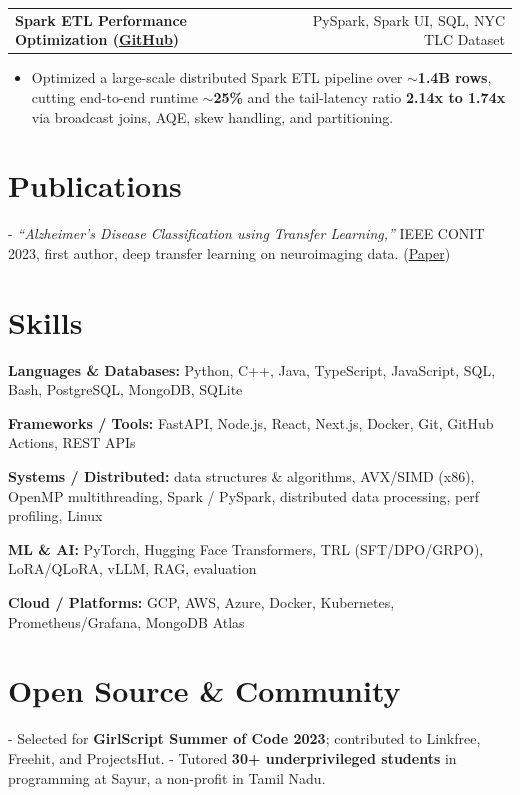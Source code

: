 \documentclass[letterpaper,11pt]{article}
\makeatletter
\newcommand{\projItem}[2]{%
  \vspace{2pt}
  \begin{tabular*}{\textwidth}{@{}l@{\extracolsep{\fill}}r@{}}
    \textbf{#1} & #2 \\
  \end{tabular*}\par\vspace{-3pt}
}
\newcommand{\skillLine}[2]{\textbf{#1:} #2\par\vspace{1.5pt}}
\newcommand{\inlineBlock}[1]{{\setlength{\leftskip}{0.18in}\small #1\par}}
\makeatother
\begin{document}
\projItem{Spark ETL Performance Optimization {\normalfont\small(\href{https://github.com/Deva-1903/Spark-ETL-Optimization}{GitHub})}}{PySpark, Spark UI, SQL, NYC TLC Dataset}
\begin{itemize}
  \item Optimized a large-scale distributed Spark ETL pipeline over \textbf{$\sim$1.4B rows}, cutting end-to-end runtime \textbf{$\sim$25\%} and the tail-latency ratio \textbf{2.14x to 1.74x} via broadcast joins, AQE, skew handling, and partitioning.
\end{itemize}

\section{Publications}
\vspace{2pt}
\inlineBlock{- \textit{``Alzheimer's Disease Classification using Transfer Learning,''} IEEE CONIT 2023, first author, deep transfer learning on neuroimaging data. {\normalfont\small(\href{https://ieeexplore.ieee.org/document/10205760}{Paper})}}

\section{Skills}
\skillLine{Languages \& Databases}{Python, C++, Java, TypeScript, JavaScript, SQL, Bash, PostgreSQL, MongoDB, SQLite}
\skillLine{Frameworks / Tools}{FastAPI, Node.js, React, Next.js, Docker, Git, GitHub Actions, REST APIs}
\skillLine{Systems / Distributed}{data structures \& algorithms, AVX/SIMD (x86), OpenMP multithreading, Spark / PySpark, distributed data processing, perf profiling, Linux}
\skillLine{ML \& AI}{PyTorch, Hugging Face Transformers, TRL (SFT/DPO/GRPO), LoRA/QLoRA, vLLM, RAG, evaluation}
\skillLine{Cloud / Platforms}{GCP, AWS, Azure, Docker, Kubernetes, Prometheus/Grafana, MongoDB Atlas}

\section{Open Source \& Community}
\inlineBlock{- Selected for \textbf{GirlScript Summer of Code 2023}; contributed to Linkfree, Freehit, and ProjectsHut. - Tutored \textbf{30+ underprivileged students} in programming at Sayur, a non-profit in Tamil Nadu.}
\end{document}
